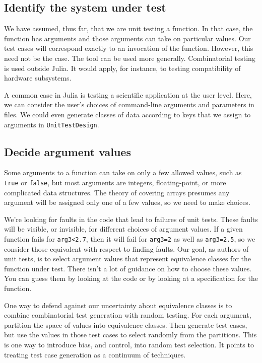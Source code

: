 \documentclass{juliacon}
\newcommand{\utd}{\texttt{UnitTestDesign}\xspace}
\begin{document}
\subsection{Identify the system under test}

We have assumed, thus far, that we are unit testing a function. In that case, the function has arguments and those arguments can take on particular values. Our test cases will correspond exactly to an invocation of the function. However, this need not be the case. The tool can be used more generally. Combinatorial testing is used outside Julia. It would apply, for instance, to testing compatibility of hardware subsystems.

A common case in Julia is testing a scientific application at the user level. Here, we can consider the user's choices of command-line arguments and parameters in files. We could even generate classes of data according to keys that we assign to arguments in \utd.

\subsection{Decide argument values}

Some arguments to a function can take on only a few allowed values, such as \verb|true| or \verb|false|, but most arguments are integers, floating-point, or more complicated data structures. The theory of covering arrays presumes any argument will be assigned only one of a few values, so we need to make choices.

\vskip 6pt
We're looking for faults in the code that lead to failures of unit tests. These faults will be visible, or invisible, for different choices of argument values. If a given function fails for \verb|arg3<2.7|, then it will fail for \verb|arg3=2| as well as \verb|arg3=2.5|, so we consider those equivalent with respect to finding faults. Our goal, as authors of unit tests, is to select argument values that represent equivalence classes for the function under test. There isn't a lot of guidance on how to choose these values. You can guess them by looking at the code or by looking at a specification for the function.

\vskip 6pt
One way to defend against our uncertainty about equivalence classes is to combine combinatorial test generation with random testing. For each argument, partition the space of values into equivalence classes. Then generate test cases, but use the values in those test cases to select randomly from the partitions. This is one way to introduce bias, and control, into random test selection. It points to treating test case generation as a continuum of techniques.
\end{document}
